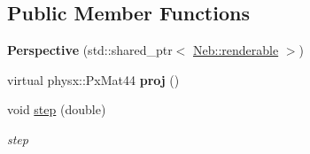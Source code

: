 \subsection*{\-Public \-Member \-Functions}
\begin{DoxyCompactItemize}
\item 
\hypertarget{classNeb_1_1Camera_1_1Projection_1_1Perspective_a0f893ad0e9a4dbe0b6de950b0d0233a3}{{\bfseries \-Perspective} (std\-::shared\-\_\-ptr$<$ \hyperlink{classNeb_1_1renderable}{\-Neb\-::renderable} $>$)}\label{classNeb_1_1Camera_1_1Projection_1_1Perspective_a0f893ad0e9a4dbe0b6de950b0d0233a3}

\item 
\hypertarget{classNeb_1_1Camera_1_1Projection_1_1Perspective_a2fec5469b70c19093e4d2932a9ceec0a}{virtual physx\-::\-Px\-Mat44 {\bfseries proj} ()}\label{classNeb_1_1Camera_1_1Projection_1_1Perspective_a2fec5469b70c19093e4d2932a9ceec0a}

\item 
\hypertarget{classNeb_1_1Camera_1_1Projection_1_1Perspective_a74771031b253ee639dff1a15e6b9c32d}{void \hyperlink{classNeb_1_1Camera_1_1Projection_1_1Perspective_a74771031b253ee639dff1a15e6b9c32d}{step} (double)}\label{classNeb_1_1Camera_1_1Projection_1_1Perspective_a74771031b253ee639dff1a15e6b9c32d}

\begin{DoxyCompactList}\small\item\em step \end{DoxyCompactList}\end{DoxyCompactItemize}
